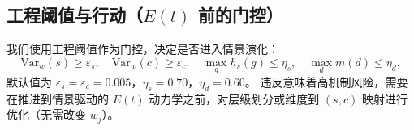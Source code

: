 \subsection{工程阈值与行动（$E(t)$ 前的门控）}

我们使用工程阈值作为门控，决定是否进入情景演化：
\begin{equation}
\mathrm{Var}_w(s)\ge \varepsilon_s,\quad
\mathrm{Var}_w(c)\ge \varepsilon_c,\quad
\max_g h_s(g)\le \eta_s,\quad
\max_d m(d)\le \eta_d,
\end{equation}
默认值为 $\varepsilon_s=\varepsilon_c=0.005$，$\eta_s=0.70$，$\eta_d=0.60$。
违反意味着高机制风险，需要在推进到情景驱动的 $E(t)$ 动力学之前，对层级划分或维度到 $(s,c)$ 映射进行优化（无需改变 $w_j$）。
